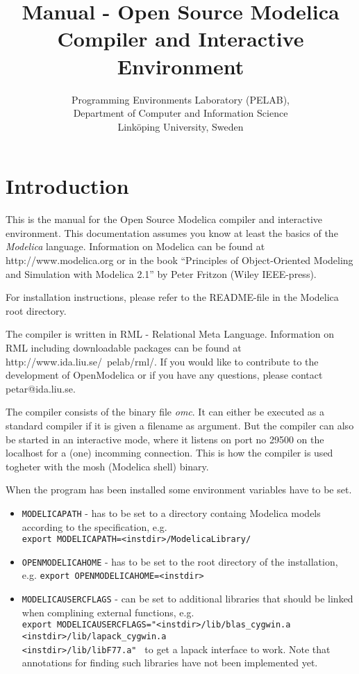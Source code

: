 \documentclass{report}
\title{Manual - Open Source Modelica Compiler and Interactive Environment}
\author{Programming Environments Laboratory (PELAB), \\ Department of Computer and Information Science \\ Link\"{o}ping University, Sweden}
\begin{document}
\maketitle
\chapter{Introduction}
This is the manual for the Open Source Modelica compiler and
interactive environment. This documentation assumes you know at least
the basics of the \emph{Modelica} language. Information on Modelica
can be found at http://www.modelica.org or in the book
``Principles of Object-Oriented Modeling and Simulation with Modelica
2.1'' by Peter Fritzon (Wiley IEEE-press).

For installation instructions, please refer to the README-file in the
Modelica root directory.

The compiler is written in RML - Relational Meta Language. Information
on RML including downloadable packages can be found at
http://www.ida.liu.se/~pelab/rml/. If you would like to
contribute to the development of OpenModelica or if you have any
questions, please contact petar@ida.liu.se.

The compiler consists of the binary file \emph{omc}. It can either
be executed as a standard compiler if it is given a filename as
argument. But the compiler can also be started in an interactive mode,
where it listens on port no 29500 on the localhost for a (one)
incomming connection. This is how the compiler is used togheter with
the mosh (Modelica shell) binary.

When the program has been installed some environment variables have to
be set.
\begin{itemize}
\item{{\tt MODELICAPATH}} - has to be set to a directory containg Modelica
models according to the specification, e.g.  \\ {\tt export
MODELICAPATH=<instdir>/ModelicaLibrary/ }
\item{{\tt OPENMODELICAHOME}} - has to be set to the root directory of the
installation, e.g. {\tt export
OPENMODELICAHOME=<instdir> } 
\item{{\tt MODELICAUSERCFLAGS}} - can be set to additional libraries
that should be linked when complining external functions, e.g. \\
{\tt export MODELICAUSERCFLAGS="<instdir>/lib/blas\_cygwin.a \\
<instdir>/lib/lapack\_cygwin.a  \\
<instdir>/lib/libF77.a" } to
get a lapack interface to work. Note that annotations for finding such
libraries have not been implemented yet.
\end{itemize}
\end{document}
